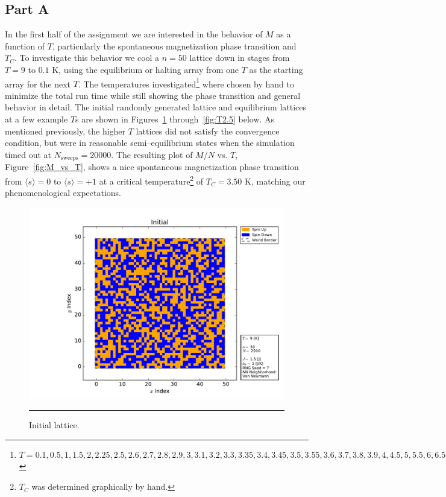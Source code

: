 \documentclass[notitlepage,aps,prd,nofootinbib]{revtex4-1}
\begin{document}
\subsection{Part A}
\label{subsec:results_part_a}
In the first half of the assignment we are interested in the behavior of $M$ as a function of $T$, particularly the spontaneous magnetization phase transition and $T_{C}$. To investigate this behavior we cool a $n=50$ lattice down in stages from $T=9$ to $0.1$ K, using the equilibrium or halting array from one $T$ as the starting array for the next $T$. The temperatures investigated\footnote{$T = 0.1, 0.5, 1, 1.5, 2, 2.25, 2.5, 2.6, 2.7, 2.8, 2.9, 3, 3.1, 3.2, 3.3, 3.35, 3.4, 3.45, 3.5, 3.55, 3.6, 3.7, 3.8, 3.9, 4, 4.5, 5, 5.5, 6, 6.5, 7, 8, 9$} where chosen by hand to minimize the total run time while still showing the phase transition and general behavior in detail. The initial randomly generated lattice and equilibrium lattices at a few example $T$s are shown in Figures~\ref{fig:initial} through~\ref{fig:T2.5} below. As mentioned previously, the higher $T$ lattices did not satisfy the convergence condition, but were in reasonable semi--equilibrium states when the simulation timed out at $N_{\mathrm{sweeps}} = 20000$. The resulting plot of $M/N$ vs. $T$, Figure~\ref{fig:M_vs_T}, shows a nice spontaneous magnetization phase transition from $\langle s \rangle = 0$ to $\langle s \rangle = +1$ at a critical temperature\footnote{$T_{C}$ was determined graphically by hand.} of $T_{C} = 3.50$ K, matching our phenomenological expectations.

\begin{figure}[!htbc]
  \centering
  \includegraphics[width=.82\textwidth]{../output/plots_for_paper_von_neumann/part_a/initial.pdf}
	{\par\nobreak\rule[9pt]{35em}{0.5pt}\vspace{-5mm}}
	\caption{Initial lattice.}
	\label{fig:initial}
\end{figure}
\end{document}
